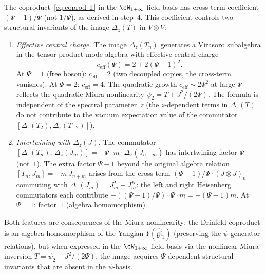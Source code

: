 \begin{remark}
\label{rem:spin2-ceff-miura}
The coproduct~\eqref{eq:coprod-T} in the
$\cW_{1+\infty}$ field basis has cross-term coefficient
$(\Psi - 1)/\Psi$ (not $1/\Psi$), as derived in step~4.
This coefficient controls two structural invariants of the
image $\Delta_z(T)$ in $V \otimes V$:
\begin{enumerate}[label=\textup{(\arabic*)}]
\item \emph{Effective central charge.}
  The image $\Delta_z(T_n)$ generates a Virasoro
  subalgebra in the tensor product mode algebra with
  effective central charge
  \begin{equation}\label{eq:c-eff-spin2}
    c_{\mathrm{eff}}(\Psi) = 2 + 2(\Psi - 1)^2.
  \end{equation}
  At $\Psi = 1$ (free boson): $c_{\mathrm{eff}} = 2$
  (two decoupled copies, the cross-term vanishes).
  At $\Psi = 2$: $c_{\mathrm{eff}} = 4$.
  The quadratic growth $c_{\mathrm{eff}} \sim 2\Psi^2$ at
  large $\Psi$ reflects the quadratic Miura nonlinearity
  $\psi_2 = T + J^2/(2\Psi)$.
  The formula is independent of the spectral parameter~$z$
  (the $z$-dependent terms in $\Delta_z(T)$ do not
  contribute to the vacuum expectation value of the
  commutator $[\Delta_z(T_2), \Delta_z(T_{-2})]$).
\item \emph{Intertwining with $\Delta_z(J)$.}
  The commutator
  $[\Delta_z(T_n),\, \Delta_z(J_m)]
  = -\Psi \cdot m \cdot \Delta_z(J_{n+m})$
  has intertwining factor $\Psi$ (not~$1$).
  The extra factor $\Psi - 1$ beyond the original algebra
  relation $[T_n, J_m] = -m\,J_{n+m}$ arises from the
  cross-term $(\Psi - 1)/\Psi \cdot (J \otimes J)_n$
  commuting with $\Delta_z(J_m) = J_m^L + J_m^R$:
  the left and right Heisenberg commutators each contribute
  $-((\Psi-1)/\Psi) \cdot \Psi \cdot m = -(\Psi - 1)m$.
  At $\Psi = 1$: factor~$1$ (algebra homomorphism).
\end{enumerate}
Both features are consequences of the Miura nonlinearity:
the Drinfeld coproduct is an algebra homomorphism of the
Yangian $Y(\widehat{\mathfrak{gl}}_1)$ (preserving the
$\psi$-generator relations), but when expressed in the
$\cW_{1+\infty}$ field basis via the nonlinear Miura
inversion $T = \psi_2 - J^2/(2\Psi)$, the image acquires
$\Psi$-dependent structural invariants that are absent in
the $\psi$-basis.
\end{remark}

